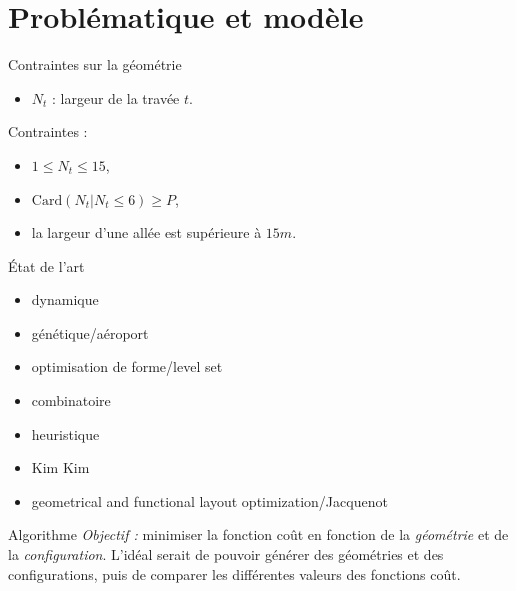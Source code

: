 \section{Problématique et modèle}

\begin{frame}{Contraintes sur la géométrie}
  \vfill 
  \begin{itemize}
  \item $N_t$ : largeur de la travée $t$.
  \end{itemize} 
  \vfill
  Contraintes : 
  \vfill
  \begin{itemize}
  \item $1 \leq N_t \leq 15$,
    \vfill
  \item $\mathrm{Card}(N_t\vert N_t \leq  6) \geq  P$,
    \vfill
  \item la largeur d'une allée est supérieure à $15m$.
    \vfill
  \end{itemize}   
  \vfill
\end{frame}

\begin{frame}{\'Etat de l'art}
  \begin{itemize}
  \item dynamique \cite{rekik2015}
  \item génétique/aéroport \cite{gotteland2004}
  \item optimisation de forme/level set \cite{allaire2006}
  \item combinatoire \cite{moussi2012}
  \item heuristique \cite{ndiaye2015}
  \item Kim Kim \cite{kim98}
  \item geometrical and functional layout optimization/Jacquenot \cite{jacquenot2010}
  \end{itemize}
\end{frame}

\begin{frame}{Algorithme}
  \vfill
  \emph{Objectif : } minimiser la fonction coût en fonction de la \emph{géométrie} et de la \emph{configuration}.
  \vfill
  L'idéal serait de pouvoir générer des géométries et des configurations, puis de comparer les différentes valeurs des fonctions coût. 
  \vfill  
\end{frame}

